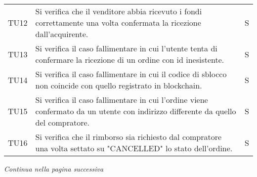 \begin{table}[H]
\begin{tabular}{c|p{10cm}|c}
    TU12 & Si verifica che il venditore abbia ricevuto i fondi correttamente una volta confermata la ricezione dall'acquirente.              & S \\
    TU13 & Si verifica il caso fallimentare in cui l'utente tenta di confermare la ricezione di un ordine con id inesistente.                & S \\
    TU14 & Si verifica il caso fallimentare in cui il codice di sblocco non coincide con quello registrato in blockchain\glo{}.                    & S \\
    TU15 & Si verifica il caso fallimentare in cui l'ordine viene confermato da un utente con indirizzo differente da quello del compratore. & S \\
    TU16 & Si verifica che il rimborso sia richiesto dal compratore una volta settato su "CANCELLED" lo stato dell'ordine.                   & S \\
  \end{tabular}
\end{table}
\begin{center}
  \textit{\small Continua nella pagina successiva}
\end{center}
